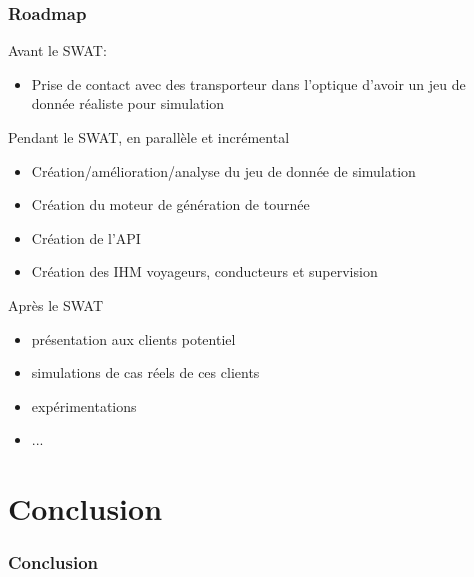 \documentclass[table]{beamer}
\begin{document}
\begin{frame}
  \frametitle{Roadmap}
  Avant le SWAT:
  \begin{itemize}
  \item Prise de contact avec des transporteur dans l'optique d'avoir
    un jeu de donnée réaliste pour simulation
  \end{itemize}

  Pendant le SWAT, en parallèle et incrémental
  \begin{itemize}
  \item Création/amélioration/analyse du jeu de donnée de simulation
  \item Création du moteur de génération de tournée
  \item Création de l'API
  \item Création des IHM voyageurs, conducteurs et supervision
  \end{itemize}
  
  Après le SWAT
  \begin{itemize}
  \item présentation aux clients potentiel
  \item simulations de cas réels de ces clients
  \item expérimentations
  \item ...
  \end{itemize}
\end{frame}

\section{Conclusion}

\begin{frame}
  \frametitle{Conclusion}
\end{frame}

\begin{frame}
  \titlepage
\end{frame}
\end{document}
